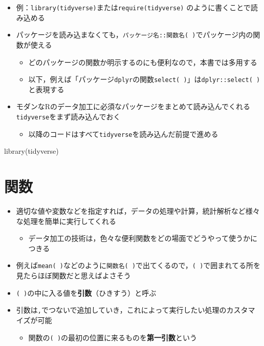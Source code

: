 \documentclass[
  xelatex,ja=standard, b5paper]{bxjsbook}
\newenvironment{Shaded}{\begin{snugshade}}{\end{snugshade}}
\newcommand{\FunctionTok}[1]{\textcolor[rgb]{0.00,0.00,0.00}{#1}}
\newcommand{\NormalTok}[1]{#1}
\providecommand{\tightlist}{%
  \setlength{\itemsep}{0pt}\setlength{\parskip}{0pt}}
\begin{document}
\begin{itemize}
\tightlist
\item
  例：\texttt{library(tidyverse)}または\texttt{require(tidyverse)} のように書くことで読み込める
\item
  パッケージを読み込まなくても，\texttt{パッケージ名::関数名(\ )}でパッケージ内の関数が使える

  \begin{itemize}
  \tightlist
  \item
    どのパッケージの関数か明示するのにも便利なので，本書では多用する
  \item
    以下，例えば「パッケージ\texttt{dplyr}の関数\texttt{select(\ )}」は\texttt{dplyr::select(\ )}と表現する
  \end{itemize}
\item
  モダンなRのデータ加工に必須なパッケージをまとめて読み込んでくれる\texttt{tidyverse}をまず読み込んでおく

  \begin{itemize}
  \tightlist
  \item
    以降のコードはすべて\texttt{tidyverse}を読み込んだ前提で進める
  \end{itemize}
\end{itemize}

\begin{Shaded}
\begin{Highlighting}[]
\FunctionTok{library}\NormalTok{(tidyverse)}
\end{Highlighting}
\end{Shaded}

\hypertarget{p-function}{%
\section{関数}\label{p-function}}

\begin{itemize}
\tightlist
\item
  適切な値や変数などを指定すれば，データの処理や計算，統計解析など様々な処理を簡単に実行してくれる

  \begin{itemize}
  \tightlist
  \item
    データ加工の技術は，色々な便利関数をどの場面でどうやって使うかにつきる
  \end{itemize}
\item
  例えば\texttt{mean(\ )}などのように\texttt{関数名(\ )}で出てくるので，\texttt{(\ )}で囲まれてる所を見たらほぼ関数だと思えばよさそう
\item
  \texttt{(\ )}の中に入る値を\textbf{引数}（ひきすう）と呼ぶ
\item
  引数は\texttt{,}でつないで追加していき，これによって実行したい処理のカスタマイズが可能

  \begin{itemize}
  \tightlist
  \item
    関数の\texttt{(\ )}の最初の位置に来るものを\textbf{第一引数}という
  \end{itemize}
\end{itemize}
\end{document}
